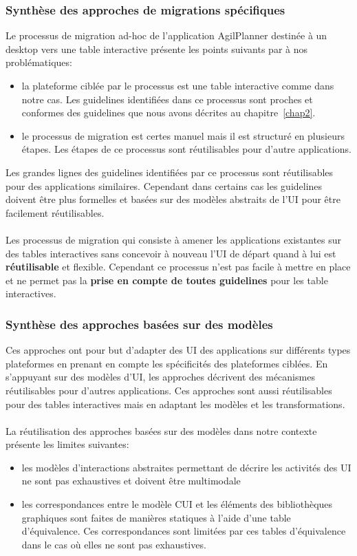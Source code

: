 \subsubsection{Synthèse des approches de migrations spécifiques}Le processus de
migration ad-hoc de l'application AgilPlanner destinée à un desktop vers une
table interactive présente les points suivants par à nos problématiques: 

\begin{itemize}
\item la plateforme ciblée par le processus est une table interactive comme dans
notre cas. Les guidelines identifiées dans ce processus sont proches et
conformes des guidelines que nous avons décrites au chapitre~\ref{chap2}.
\item le processus de migration est certes manuel mais il est structuré en
plusieurs étapes. Les étapes de ce processus sont réutilisables pour d'autre
applications.
\end{itemize}
Les grandes lignes des guidelines identifiées par ce processus sont
réutilisables pour des applications similaires. Cependant dans certains cas les
guidelines doivent être plus formelles et basées sur des modèles abstraits de
l'UI pour être facilement réutilisables.

\paragraph{}Les processus de migration qui consiste à amener les applications
existantes sur des tables interactives sans concevoir à nouveau l'UI de départ
quand à lui est \textbf{réutilisable} et flexible. Cependant ce processus n'est
pas facile à mettre en place et ne permet pas la \textbf{prise en compte de
toutes guidelines} pour les table interactives.
\subsubsection{Synthèse des approches basées sur des modèles}
Ces approches ont pour but d'adapter des UI des applications sur différents
types plateformes en prenant en compte les spécificités des plateformes ciblées.
En s'appuyant sur des modèles d'UI, les approches décrivent des mécanismes
réutilisables pour d'autres applications. Ces approches sont aussi réutilisables
pour des tables interactives mais en adaptant les modèles et les
transformations. 
\paragraph{}La réutilisation des approches basées sur des modèles dans notre
contexte présente les limites suivantes:
\begin{itemize}
\item les modèles d'interactions abstraites permettant de décrire les activités
des UI ne sont pas exhaustives et doivent être multimodale
\item les correspondances entre le modèle CUI et les éléments des bibliothèques
graphiques sont faites de manières statiques à l'aide d'une table d'équivalence.
Ces correspondances sont limitées par ces tables d'équivalence dans le cas où
elles ne sont pas exhaustives.
\end{itemize}
